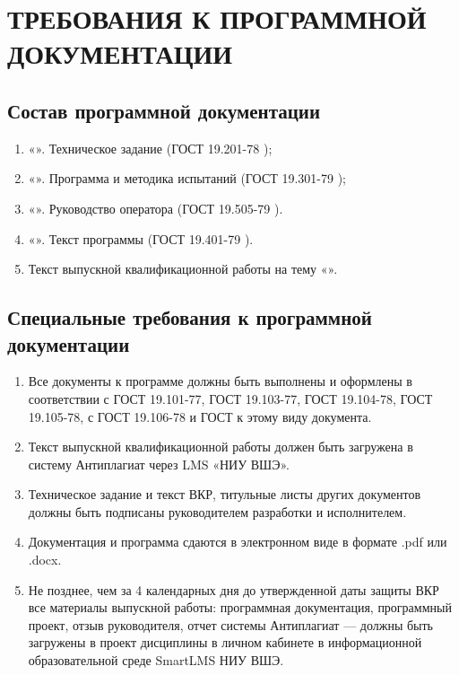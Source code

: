 \section{ТРЕБОВАНИЯ К ПРОГРАММНОЙ ДОКУМЕНТАЦИИ}

\subsection{Состав программной документации}

\begin{enumerate}
    \item «\docTitle». Техническое задание (ГОСТ 19.201-78 \cite{gost:19.201-78});
    \item «\docTitle». Программа и методика испытаний (ГОСТ 19.301-79 \cite{gost:19.301-79});
    \item «\docTitle». Руководство оператора (ГОСТ 19.505-79  \cite{gost:19.505-79}).
    \item «\docTitle». Текст программы (ГОСТ 19.401-79 \cite{gost:19.401-79}).
    \item Текст выпускной квалификационной работы на тему «\docTitle».
\end{enumerate}

\subsection{Специальные требования к программной документации}

\begin{enumerate}
    \item Все документы к программе должны быть выполнены и оформлены в соответствии с
    ГОСТ 19.101-77, ГОСТ 19.103-77, ГОСТ 19.104-78, ГОСТ 19.105-78, с ГОСТ 19.106-78 и ГОСТ к этому виду документа.
    \item Текст выпускной квалификационной работы должен быть загружена в систему Антиплагиат через LMS «НИУ ВШЭ».
    \item Техническое задание и текст ВКР, титульные листы других документов должны быть подписаны руководителем разработки и исполнителем.
    \item Документация и программа сдаются в электронном виде в формате .pdf или .docx.
    \item Не позднее, чем за 4 календарных дня до утвержденной даты защиты ВКР все материалы выпускной работы: программная документация, программный проект, отзыв руководителя, отчет системы Антиплагиат — должны быть загружены в проект дисциплины в личном кабинете в информационной образовательной среде SmartLMS НИУ ВШЭ.
\end{enumerate}

\clearpage